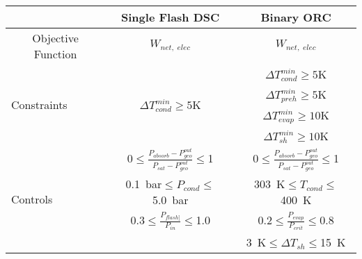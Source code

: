\begin{tabular}{|c | c c |}
    \hline
    \rowcolor{bluepoli!40} %
      & \textbf{Single Flash DSC} & \textbf{Binary ORC} \T\B \\
    \hline \hline
    Objective Function & \(W_{net,\;elec}\) & \(W_{net,\;elec}\) \T\B \\
    \hline
    \multicolumn{1}{|l|}{\multirow{4}{*}{Constraints}} & \multirow{4}{*}{\(\Delta T_{cond}^{min}\geq5\)\unit{\K}} & \(\Delta T_{cond}^{min}\geq5\)\unit{\K} \T\B \\
    \multicolumn{1}{|l|}{} &  & \(\Delta T_{preh}^{min}\geq5\)\unit{\K} \T\B \\
    \multicolumn{1}{|l|}{} &  & \(\Delta T_{evap}^{min}\geq10\)\unit{\K} \T\B \\
    \multicolumn{1}{|l|}{} &  & \(\Delta T_{sh}^{min}\geq10\)\unit{\K} \T\B \\
    \hline
    \multicolumn{1}{|l|}{\multirow{4}{*}{Controls}} & \num{0}\(\leq \frac{P_{absorb} - P_{geo}^{out}}{P_{sat} - P_{geo}^{out}}\leq\)\num{1} & \num{0}\(\leq \frac{P_{absorb} - P_{geo}^{out}}{P_{sat} - P_{geo}^{out}}\leq\)\num{1} \T\B \\
    \multicolumn{1}{|l|}{} & \qty{0.1}{\bar}\(\leq P_{cond}\leq\)\qty{5.0}{\bar} & \qty{303}{\K}\(\leq T_{cond}\leq\)\qty{400}{\K} \T\B \\
 
    \multicolumn{1}{|l|}{} & \num{0.3}\(\leq \frac{P_{flash]}}{P_{in}}\leq\)\num{1.0} & \num{0.2}\(\leq \frac{P_{evap}}{P_{crit}}\leq\)\num{0.8} \T\B \\
    \multicolumn{1}{|l|}{} &  & \qty{3}{\K}\(\leq \Delta T_{sh}\leq\)\qty{15}{\K} \T\B \\
    \hline
\end{tabular}